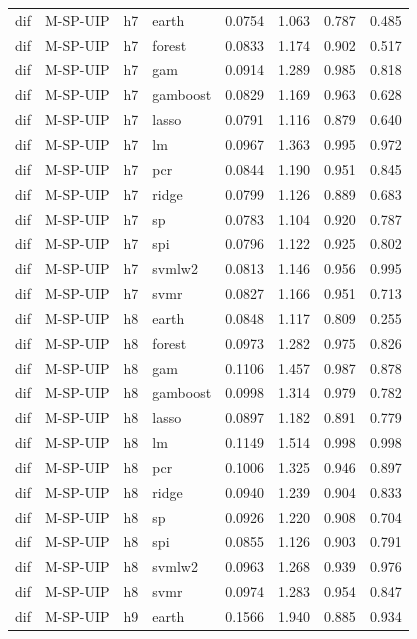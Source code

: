 \begin{ThreePartTable}
\begin{longtable}[t]{llclcccc}
\addlinespace
dif & M-SP-UIP & h7 & earth & 0.0754 & 1.063 & 0.787 & 0.485\\
dif & M-SP-UIP & h7 & forest & 0.0833 & 1.174 & 0.902 & 0.517\\
dif & M-SP-UIP & h7 & gam & 0.0914 & 1.289 & 0.985 & 0.818\\
dif & M-SP-UIP & h7 & gamboost & 0.0829 & 1.169 & 0.963 & 0.628\\
dif & M-SP-UIP & h7 & lasso & 0.0791 & 1.116 & 0.879 & 0.640\\
dif & M-SP-UIP & h7 & lm & 0.0967 & 1.363 & 0.995 & 0.972\\
dif & M-SP-UIP & h7 & pcr & 0.0844 & 1.190 & 0.951 & 0.845\\
dif & M-SP-UIP & h7 & ridge & 0.0799 & 1.126 & 0.889 & 0.683\\
dif & M-SP-UIP & h7 & sp & 0.0783 & 1.104 & 0.920 & 0.787\\
dif & M-SP-UIP & h7 & spi & 0.0796 & 1.122 & 0.925 & 0.802\\
dif & M-SP-UIP & h7 & svmlw2 & 0.0813 & 1.146 & 0.956 & 0.995\\
dif & M-SP-UIP & h7 & svmr & 0.0827 & 1.166 & 0.951 & 0.713\\
\addlinespace
dif & M-SP-UIP & h8 & earth & 0.0848 & 1.117 & 0.809 & 0.255\\
dif & M-SP-UIP & h8 & forest & 0.0973 & 1.282 & 0.975 & 0.826\\
dif & M-SP-UIP & h8 & gam & 0.1106 & 1.457 & 0.987 & 0.878\\
dif & M-SP-UIP & h8 & gamboost & 0.0998 & 1.314 & 0.979 & 0.782\\
dif & M-SP-UIP & h8 & lasso & 0.0897 & 1.182 & 0.891 & 0.779\\
dif & M-SP-UIP & h8 & lm & 0.1149 & 1.514 & 0.998 & 0.998\\
dif & M-SP-UIP & h8 & pcr & 0.1006 & 1.325 & 0.946 & 0.897\\
dif & M-SP-UIP & h8 & ridge & 0.0940 & 1.239 & 0.904 & 0.833\\
dif & M-SP-UIP & h8 & sp & 0.0926 & 1.220 & 0.908 & 0.704\\
dif & M-SP-UIP & h8 & spi & 0.0855 & 1.126 & 0.903 & 0.791\\
dif & M-SP-UIP & h8 & svmlw2 & 0.0963 & 1.268 & 0.939 & 0.976\\
dif & M-SP-UIP & h8 & svmr & 0.0974 & 1.283 & 0.954 & 0.847\\
\addlinespace
dif & M-SP-UIP & h9 & earth & 0.1566 & 1.940 & 0.885 & 0.934\\

\end{longtable}
\end{ThreePartTable}
